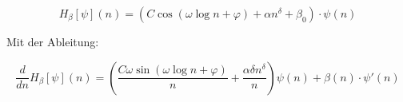 \documentclass[12pt]{article}
\begin{document}
\begin{equation}
\boxed{
H_\beta[\psi](n) = 
\left(C \cos(\omega \log n + \varphi) + \alpha n^\delta + \beta_0 \right) \cdot \psi(n)
}
\end{equation}

\bigskip

\noindent Mit der Ableitung:

\begin{equation}
\boxed{
\frac{d}{dn} H_\beta[\psi](n) = 
\left(\frac{C \omega \sin(\omega \log n + \varphi)}{n} + \frac{\alpha \delta n^\delta}{n} \right) \psi(n) + \beta(n) \cdot \psi'(n)
}
\end{equation}

\vfill
\end{document}
